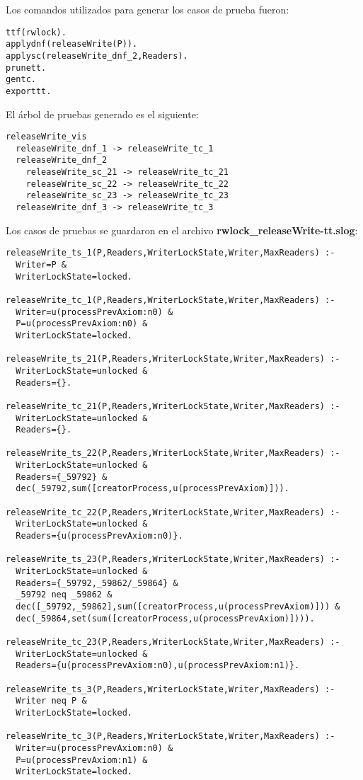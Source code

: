 \documentclass[a4paper, 12pt]{article}
\begin{document}
Los comandos utilizados para generar los casos de prueba fueron:
\begin{verbatim}
ttf(rwlock).
applydnf(releaseWrite(P)).
applysc(releaseWrite_dnf_2,Readers).
prunett.
gentc.
exporttt.
\end{verbatim}

El árbol de pruebas generado es el siguiente:
\begin{verbatim}
releaseWrite_vis
  releaseWrite_dnf_1 -> releaseWrite_tc_1
  releaseWrite_dnf_2
    releaseWrite_sc_21 -> releaseWrite_tc_21
    releaseWrite_sc_22 -> releaseWrite_tc_22
    releaseWrite_sc_23 -> releaseWrite_tc_23
  releaseWrite_dnf_3 -> releaseWrite_tc_3
\end{verbatim}

Los casos de pruebas se guardaron en el archivo \textbf{rwlock\_releaseWrite-tt.slog}:
\begin{verbatim}
releaseWrite_ts_1(P,Readers,WriterLockState,Writer,MaxReaders) :-
  Writer=P &
  WriterLockState=locked.

releaseWrite_tc_1(P,Readers,WriterLockState,Writer,MaxReaders) :-
  Writer=u(processPrevAxiom:n0) &
  P=u(processPrevAxiom:n0) &
  WriterLockState=locked.

releaseWrite_ts_21(P,Readers,WriterLockState,Writer,MaxReaders) :-
  WriterLockState=unlocked &
  Readers={}.

releaseWrite_tc_21(P,Readers,WriterLockState,Writer,MaxReaders) :-
  WriterLockState=unlocked &
  Readers={}.

releaseWrite_ts_22(P,Readers,WriterLockState,Writer,MaxReaders) :-
  WriterLockState=unlocked &
  Readers={_59792} &
  dec(_59792,sum([creatorProcess,u(processPrevAxiom)])).

releaseWrite_tc_22(P,Readers,WriterLockState,Writer,MaxReaders) :-
  WriterLockState=unlocked &
  Readers={u(processPrevAxiom:n0)}.

releaseWrite_ts_23(P,Readers,WriterLockState,Writer,MaxReaders) :-
  WriterLockState=unlocked &
  Readers={_59792,_59862/_59864} &
  _59792 neq _59862 &
  dec([_59792,_59862],sum([creatorProcess,u(processPrevAxiom)])) &
  dec(_59864,set(sum([creatorProcess,u(processPrevAxiom)]))).

releaseWrite_tc_23(P,Readers,WriterLockState,Writer,MaxReaders) :-
  WriterLockState=unlocked &
  Readers={u(processPrevAxiom:n0),u(processPrevAxiom:n1)}.

releaseWrite_ts_3(P,Readers,WriterLockState,Writer,MaxReaders) :-
  Writer neq P &
  WriterLockState=locked.

releaseWrite_tc_3(P,Readers,WriterLockState,Writer,MaxReaders) :-
  Writer=u(processPrevAxiom:n0) &
  P=u(processPrevAxiom:n1) &
  WriterLockState=locked.
\end{verbatim}
\end{document}
